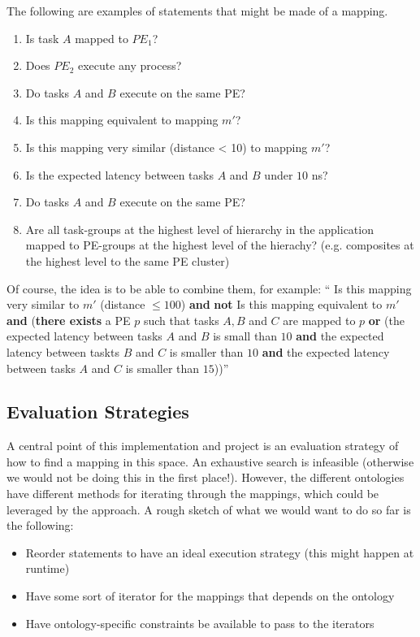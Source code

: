 The following are examples of statements that might be made of a mapping.
\begin{enumerate}
\item Is task $A$ mapped to $PE_1$?
\item Does $PE_2$ execute any process?
\item Do tasks $A$ and $B$ execute on the same PE?
\item Is this mapping equivalent to mapping $m'$?
\item Is this mapping very similar (distance < 10) to mapping $m'$? 
\item Is the expected latency between tasks $A$ and $B$ under $10$ ns?
\item Do tasks $A$ and $B$ execute on the same PE?
\item Are all task-groups at the highest level of hierarchy in the application mapped to PE-groups at the highest level of the hierachy? (e.g. composites at the highest level to the same PE cluster)
\end{enumerate}

Of course, the idea is to be able to combine them, for example:
`` Is this mapping very similar to $m'$ (distance $\leq 100$) \textbf{and} \textbf{not} Is this mapping equivalent to $m'$ \textbf{and} (\textbf{there exists} a PE $p$ such that tasks $A, B$ and $C$ are mapped to $p$ \textbf{or} (the expected latency between tasks $A$ and $B$ is small than $10$ \textbf{and} the expected latency between taskts $B$ and $C$ is smaller than $10$ \textbf{and} the expected latency between tasks $A$ and $C$ is smaller than $15$))''
\subsection{Evaluation Strategies}
A central point of this implementation and project is an evaluation strategy of how to find a mapping in this space.
An exhaustive search is infeasible (otherwise we would not be doing this in the first place!).
However, the different ontologies have different methods for iterating through the mappings, which could be leveraged by the approach. A rough sketch of what we would want to do so far is the following:
\begin{itemize}
\item Reorder statements to have an ideal execution strategy (this might happen at runtime)
\item Have some sort of iterator for the mappings that depends on the ontology
\item Have ontology-specific constraints be available to pass to the iterators
\end{itemize}